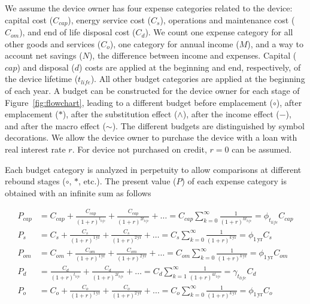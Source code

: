 
We assume the device owner has four expense categories 
related to the device:
capital cost ($C_{cap}$), 
energy service cost ($C_s$), 
operations and maintenance cost ($C_{om}$), and
end of life disposal cost ($C_d$).
We count one expense category for all other
goods and services ($C_o$),
one category for annual income ($M$), and 
a way to account net savings ($N$), 
the difference between income and expenses.
Capital ($cap$) and disposal ($d$) costs are applied
at the beginning and end, respectively, 
of the device lifetime ($t_{life}$).
All other budget categories are 
applied at the beginning of each year.
A budget can be constructed for the device owner for each stage
of Figure~\ref{fig:flowchart}, 
leading to a different budget 
before emplacement ($\circ$), 
after emplacement ($*$), 
after the substitution effect ($\wedge$), 
after the income effect ($-$), and 
after the macro effect ($\sim$).
The different budgets are distinguished by symbol decorations.
We allow the device owner to purchase the device 
with a loan with real interest rate $r$.
For device not purchased on credit,
$r = 0$ can be assumed.

Each budget category is analyzed in perpetuity
to allow comparisons at different rebound stages 
($\circ$, $*$, etc.).
The present value ($P$) of each expense category is obtained
with an infinite sum as follows

\begin{align} \label{eq:present_values}
  P_{cap} &= C_{cap} + \frac{C_{cap}}{(1 + r)^{t_{life}}} + \frac{C_{cap}}{(1 + r)^{2 t_{life}}} + \ldots 
  = C_{cap} \sum_{k = 0}^{\infty} \frac{1}{(1 + r)^{k t_{life}}} 
  = \phi_{t_{life}} C_{cap} \\
%
  P_s &= C_s + \frac{C_s}{(1 + r)^{\mathrm{1\,yr}}} + \frac{C_s}{(1 + r)^{2\,\mathrm{yr}}} + \ldots
  = C_s \sum_{k = 0}^{\infty} \frac{1}{(1 + r)^{k\,\mathrm{yr}}}
  = \phi_{1\,\mathrm{yr}} C_s \\
%
  P_{om} &= C_{om} + \frac{C_{om}}{(1 + r)^{\mathrm{1\,yr}}} +  \frac{C_{om}}{(1 + r)^{2\,\mathrm{yr}}} + \ldots
  = C_{om} \sum_{k = 0}^{\infty} \frac{1}{(1 + r)^{k\,\mathrm{yr}}}
  = \phi_{1\,\mathrm{yr}} C_{om} \\
%
  P_d &= \frac{C_d}{(1 + r)^{t_{life}}} + \frac{C_d}{(1 + r)^{2 t_{life}}} + \ldots 
  = C_d \sum_{k = 1}^{\infty} \frac{1}{(1 + r)^{k t_{life}}} 
  = \gamma_{t_{life}} C_d \\
%
  P_o &= C_o + \frac{C_o}{(1 + r)^{\mathrm{1\,yr}}} +  \frac{C_o}{(1 + r)^{2\,\mathrm{yr}}} + \ldots
  = C_o \sum_{k = 0}^{\infty} \frac{1}{(1 + r)^{k\,\mathrm{yr}}}
  = \phi_{1\,\mathrm{yr}} C_o
\end{align}
%



